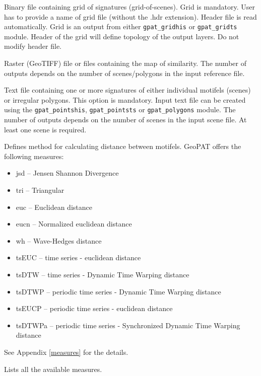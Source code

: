 
Binary file containing grid of signatures (grid-of-scenes). 
Grid is mandatory. 
User has to provide a name of grid file (without the .hdr extension). 
Header file is read automatically. 
Grid is an output from either {\tt gpat\_gridhis} or {\tt gpat\_gridts} module. 
Header of the grid will define topology of the output layers. 
Do not modify header file.


Raster (GeoTIFF) file or files containing the map of similarity. 
The number of outputs depends on the number of scenes/polygons in the input reference file. 


Text file containing one or more signatures of either individual motifels (scenes) or irregular polygons. 
This option is mandatory. 
Input text file can be created using the {\tt gpat\_pointshis}, {\tt gpat\_pointsts} or {\tt gpat\_polygons} module. 
The number of outputs depends on the number of scenes in the input scene file. 
At least one scene is required. 


Defines method for calculating distance between motifels. 
GeoPAT offers the following measures: 
\begin{itemize}
	\item jsd -- Jensen Shannon Divergence
	\item tri -- Triangular
	\item euc -- Euclidean distance
	\item eucn -- Normalized euclidean distance
	\item wh -- Wave-Hedges distance
	\item tsEUC -- time series - euclidean distance
	\item tsDTW -- time series - Dynamic Time Warping distance
	\item tsDTWP -- periodic time series - Dynamic Time Warping distance
	\item tsEUCP -- periodic time series - euclidean distance
	\item tsDTWPa -- periodic time series - Synchronized Dynamic Time Warping distance
\end{itemize}
See Appendix \ref{measures} for the details.


Lists all the available measures.

